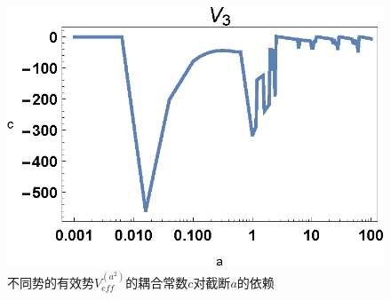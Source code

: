 \documentclass[cs4size,titlepage,twoside]{ctexart}
\begin{document}
\begin{figure}[!hbtp]
\begin{minipage}[t]{0.329\linewidth}
		\centering
		\includegraphics[width=1\textwidth]{V3_c1_veus_a}
	\end{minipage}
	\caption{不同势的有效势$V_{eff}^{(a^2)}$的耦合常数$c$对截断$a$的依赖}\label{multicva}
\end{figure}
\end{document}
